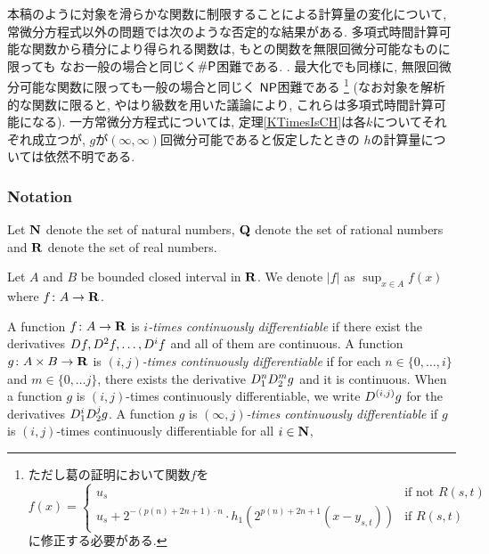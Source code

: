 本稿のように対象を滑らかな関数に制限することによる計算量の変化について,
常微分方程式以外の問題では次のような否定的な結果がある.
多項式時間計算可能な関数から積分により得られる関数は, 
もとの関数を無限回微分可能なものに限っても
なお一般の場合と同じく$\mathsf{\#P}$困難である. 
\cite[定理5.33]{ko1991complexity}.
最大化でも同様に, 
無限回微分可能な関数に限っても一般の場合と同じく
$\mathsf{NP}$困難である\cite[定理3.7]{ko1991complexity}%
\footnote{%
ただし葛\cite[定理3.7]{ko1991complexity}の証明において関数$f$を
\[f(x) = 
\begin{cases}
 u_s & \text{if not } R(s,t) \\
 u_s + 2^{-(p(n)+2n+1)\cdot n} \cdot h_1(2^{p(n)+2n+1} (x - y_{s,t})) & \text{if } R(s,t)
\end{cases}\]
に修正する必要がある.
}
(なお対象を解析的な関数に限ると, 
やはり級数を用いた議論により, 
これらは多項式時間計算可能になる). 
一方常微分方程式については, 
定理\ref{KTimesIsCH}は各$k$についてそれぞれ成立つが, 
$g$が$(\infty, \infty)$回微分可能であると仮定したときの
$h$の計算量については依然不明である. 

\subsubsection*{Notation}
Let $\mathbf N$ denote the set of natural numbers,
$\mathbf Q$ denote the set of rational numbers 
and $\mathbf R$ denote the set of real numbers.

Let $A$ and $B$ be bounded closed interval in $\mathbf R$.
We denote $|f|$ as $\sup_{x \in A} f(x)$ where $f \colon A \to \mathbf R$.

A function $f \colon A \to \mathbf R$ is \emph{$i$-times continuously differentiable}
if there exist the derivatives $D f, D^2 f, \dots, D^i f$ and all of them are continuous.
A function $g \colon A \times B \to \mathbf R$ is \emph{$(i, j)$-times continuously  differentiable}
if for each $n \in \{0, \dots, i\}$ and $m \in \{0, \dots j\}$,
there exists the derivative $D_1^n D_2^m g$ and it is continuous.
When a function $g$ is $(i, j)$-times continuously differentiable,
we write $D^{(i,j)}g$ for the derivatives $D_1^i D_2^j g$.
A function $g$ is \emph{$(\infty, j)$-times continuously differentiable}
if $g$ is $(i, j)$-times continuously differentiable for all $i \in \mathbf N$,
